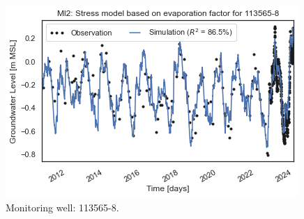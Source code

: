 \begin{figure}[htbp]
\begin{minipage}{0.32\textwidth}
        \includegraphics[width=\linewidth]{frontmatter/Rozenburg-fig/1135658.png}
        \caption{Monitoring well: 113565-8.}
        \label{fig:113565-8}
    \end{minipage}
\end{figure}
